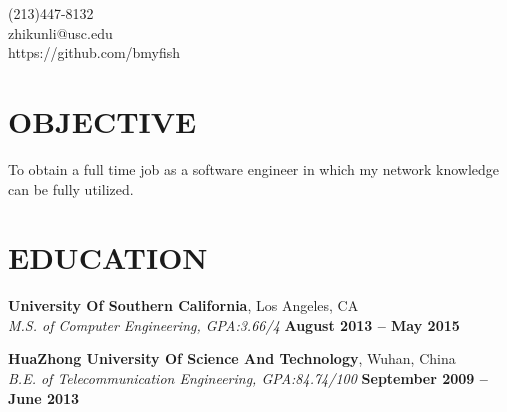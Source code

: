 \documentclass[margin,line]{resume}
\begin{document}
{
	\sc
    \hfill (213)447-8132                  		  \vspace{0mm}\\\vspace{0mm}%
    \hfill zhikunli@usc.edu            		      \vspace{0mm}\\\vspace{0mm}%
    \hfill https://github.com/bmyfish             \vspace{0mm}\\\vspace{-10mm}%
}
\vspace{1mm}

\begin{resume}

\vspace{1mm}
	\section{\mysidestyle \textbf{\large{O}\small{BJECTIVE}}}
	To obtain a full time job as a software engineer in which my network knowledge can be fully utilized.

	\sectionline

    \section{\mysidestyle \textbf{\large{E}\small{DUCATION}}}
    \textbf{\listing University Of Southern California}, Los Angeles, CA \vspace{2mm}\\\vspace{1mm}%
    \textsl{M.S. of Computer Engineering, GPA:3.66/4} \hfill \textbf{August 2013 -- May 2015}\vspace{-3mm}\\\vspace{-1mm}%

    \textbf{\listing HuaZhong University Of Science And Technology}, Wuhan, China \vspace{2mm}\\\vspace{1mm}%
    \textsl{B.E. of Telecommunication Engineering, GPA:84.74/100} \hfill \textbf{September 2009 -- June 2013}\vspace{-3mm}\\\vspace{-1mm}%



\end{resume}
\end{document}
